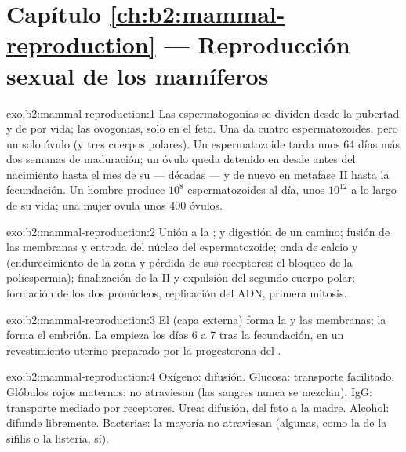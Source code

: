 \section*{Capítulo \ref{ch:b2:mammal-reproduction} --- Reproducción sexual de los mamíferos}

\begin{solution}{exo:b2:mammal-reproduction:1}
Las espermatogonias se dividen desde la pubertad y de por vida; las
ovogonias, solo en el feto. Una  da cuatro espermatozoides, pero un
solo óvulo (y tres cuerpos polares). Un espermatozoide tarda unos 64 días
más dos semanas de maduración; un óvulo queda detenido en  desde
antes del nacimiento hasta el mes de su  --- décadas --- y de
nuevo en metafase II hasta la fecundación. Un hombre produce $10^{8}$
espermatozoides al día, unos $10^{12}$ a lo largo de su vida; una mujer
ovula unos 400 óvulos.
\end{solution}

\begin{solution}{exo:b2:mammal-reproduction:2}
Unión a la ;  y digestión de un camino;
fusión de las membranas y entrada del núcleo del espermatozoide; onda de
calcio y  (endurecimiento de la zona y pérdida de sus
receptores: el bloqueo de la poliespermia); finalización de la  II
y expulsión del segundo cuerpo polar; formación de los dos pronúcleos,
replicación del ADN, primera mitosis.
\end{solution}

\begin{solution}{exo:b2:mammal-reproduction:3}
El  (capa externa) forma la  y las membranas; la  forma el embrión. La  empieza los días 6 a 7
tras la fecundación, en un revestimiento uterino preparado por la
progesterona del .
\end{solution}

\begin{solution}{exo:b2:mammal-reproduction:4}
Oxígeno: difusión. Glucosa: transporte facilitado. Glóbulos rojos
maternos: no atraviesan (las sangres nunca se mezclan). IgG: transporte
mediado por receptores. Urea: difusión, del feto a la madre. Alcohol:
difunde libremente. Bacterias: la mayoría no atraviesan (algunas, como la
de la sífilis o la listeria, sí).
\end{solution}

